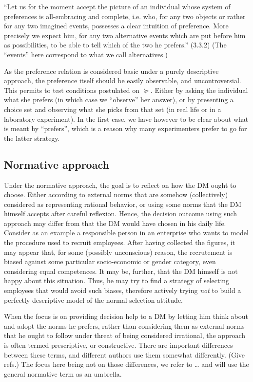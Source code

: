 \documentclass[french, english]{llncs}
\begin{document}
	“Let us for the moment accept the picture of an individual whose system of preferences is all-embracing and complete, i.e. who, for any two objects or rather for any two imagined events, possesses a clear intuition of preference. More precisely we expect him, for any two alternative events which are put before him as possibilities, to be able to tell which of the two he prefers.” (3.3.2) (The “events” here correspond to what we call alternatives.)
	
	As the preference relation is considered basic under a purely descriptive approach, the preference itself should be easily observable, and uncontroversial. This permits to test conditions postulated on $\succeq$. Either by asking the individual what she prefers (in which case we “observe” her answer), or by presenting a choice set and observing what she picks from that set (in real life or in a laboratory experiment). In the first case, we have however to be clear about what is meant by “prefers”, which is a reason why many experimenters prefer to go for the latter strategy.
	
	\subsection{Normative approach}
	Under the normative approach, the goal is to reflect on how the \ac{DM} ought to choose. Either according to external norms that are somehow (collectively) considered as representing rational behavior, or using some norms that the \ac{DM} himself accepts after careful reflexion. Hence, the decision outcome using such approach may differ from that the \ac{DM} would have chosen in his daily life. Consider as an example a responsible person in an enterprise who wants to model the procedure used to recruit employees. After having collected the figures, it may appear that, for some (possibly unconscious) reason, the recrutement is biased against some particular socio-economic or gender category, even considering equal competences. It may be, further, that the \ac{DM} himself is not happy about this situation. Thus, he may try to find a strategy of selecting employees that would avoid such biases, therefore actively trying \emph{not} to build a perfectly descriptive model of the normal selection attitude.
	
	When the focus is on providing decision help to a \ac{DM} by letting him think about and adopt the norms he prefers, rather than considering them as external norms that he ought to follow under threat of being considered irrational, the approach is often termed prescriptive, or constructive. There are important differences between these terms, and different authors use them somewhat differently. (Give refs.) The focus here being not on those differences, we refer to … and will use the general normative term as an umbrella.
	
\end{document}
